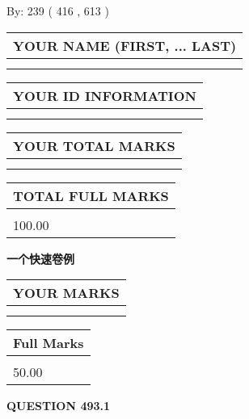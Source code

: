\documentclass{ctexart}
\begin{document}
   
\hspace{1.0in} By: 
 239 ( 416 ,  613 )
   
   
   
   
\newpage 
\setcounter{page}{ 
   493001 } 
   
   
   
   
\noindent\begin{tabular}{|l|}
\hline
YOUR NAME (FIRST, ... LAST)  \\
\hline
 \\ 
 \\ 
\hline
\end{tabular}
\hspace{0.05in} \begin{tabular}{|l|}
\hline
 YOUR   ID   INFORMATION  \\
\hline
 \\ 
 \\ 
\hline
\end{tabular}
   
   
\vspace{0.2in}\noindent\begin{tabular}{|l|}
\hline
YOUR TOTAL MARKS  \\
\hline
 \\ 
 \\ 
\hline
\end{tabular}
\hspace{0.05in} \begin{tabular}{|l|}
\hline
TOTAL FULL MARKS  \\
\hline
 \\ 
100.00 \\
\hline
\end{tabular}
   
   
 \vspace{0.2in}
{\LARGE {\textbf{ 一个快速卷例}}}
   
   
  
\vspace{0.2in}
  
\noindent\begin{tabular}{|l|}
\hline
 YOUR MARKS  \\
\hline
 \\ 
 \\ 
\hline
\end{tabular}
\hspace{0.05in} \begin{tabular}{|l|}
\hline
 Full Marks  \\
\hline
 \\ 
50.00 \\
\hline
\end{tabular}
{\textbf{\Large{QUESTION
493.1 
}}}
  
\end{document}
